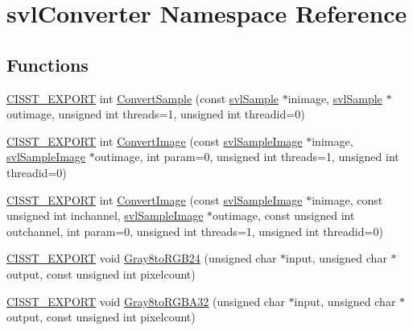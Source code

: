 \hypertarget{namespacesvl_converter}{\section{svl\-Converter Namespace Reference}
\label{namespacesvl_converter}
}
\subsection*{Functions}
\begin{DoxyCompactItemize}
\item 
\hyperlink{cmn_export_macros_8h_a99393e0c3ac434b2605235bbe20684f8}{C\-I\-S\-S\-T\-\_\-\-E\-X\-P\-O\-R\-T} int \hyperlink{namespacesvl_converter_a9f5ced81829331b45c476d7172e9a92b}{Convert\-Sample} (const \hyperlink{classsvl_sample}{svl\-Sample} $\ast$inimage, \hyperlink{classsvl_sample}{svl\-Sample} $\ast$outimage, unsigned int threads=1, unsigned int threadid=0)
\item 
\hyperlink{cmn_export_macros_8h_a99393e0c3ac434b2605235bbe20684f8}{C\-I\-S\-S\-T\-\_\-\-E\-X\-P\-O\-R\-T} int \hyperlink{namespacesvl_converter_a154cc93cbcea8a81917ba9018bcceae2}{Convert\-Image} (const \hyperlink{classsvl_sample_image}{svl\-Sample\-Image} $\ast$inimage, \hyperlink{classsvl_sample_image}{svl\-Sample\-Image} $\ast$outimage, int param=0, unsigned int threads=1, unsigned int threadid=0)
\item 
\hyperlink{cmn_export_macros_8h_a99393e0c3ac434b2605235bbe20684f8}{C\-I\-S\-S\-T\-\_\-\-E\-X\-P\-O\-R\-T} int \hyperlink{namespacesvl_converter_aea0e346b7e486f28816daeebc3d9c5cd}{Convert\-Image} (const \hyperlink{classsvl_sample_image}{svl\-Sample\-Image} $\ast$inimage, const unsigned int inchannel, \hyperlink{classsvl_sample_image}{svl\-Sample\-Image} $\ast$outimage, const unsigned int outchannel, int param=0, unsigned int threads=1, unsigned int threadid=0)
\item 
\hyperlink{cmn_export_macros_8h_a99393e0c3ac434b2605235bbe20684f8}{C\-I\-S\-S\-T\-\_\-\-E\-X\-P\-O\-R\-T} void \hyperlink{namespacesvl_converter_a7ae77af4245103cabc708474150364b4}{Gray8to\-R\-G\-B24} (unsigned char $\ast$input, unsigned char $\ast$output, const unsigned int pixelcount)
\item 
\hyperlink{cmn_export_macros_8h_a99393e0c3ac434b2605235bbe20684f8}{C\-I\-S\-S\-T\-\_\-\-E\-X\-P\-O\-R\-T} void \hyperlink{namespacesvl_converter_a7bd97b67111fd8ff6457031deec5306c}{Gray8to\-R\-G\-B\-A32} (unsigned char $\ast$input, unsigned char $\ast$output, const unsigned int pixelcount)

\end{DoxyCompactItemize}

